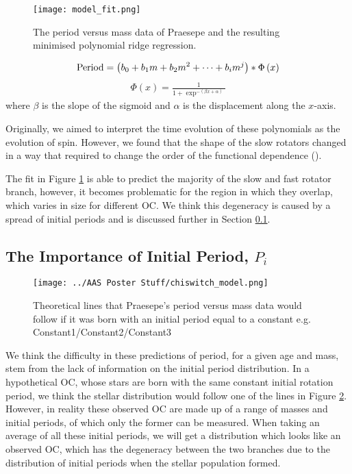 \documentclass[fleqn,usenatbib]{mnras}
\begin{document}
{\begin{figure}
	\texttt{[image: model\_fit.png]}
	\caption{The period versus mass data of Praesepe and the resulting minimised polynomial ridge regression.}
	\label{fig:model_fit}
\end{figure}
\begin{align}
	\label{eq:poly+sigmoid}
	\textup{Period} = \left(b_0 + b_1m + b_2m^2+\dots+b_im^j\right)*\Phi\left(x\right)
\end{align}
\begin{align}
	\label{eq:sigmoid}
	\Phi\left(x\right) = \frac{1}{1 + \exp^{-(\beta x + \alpha)}}
\end{align}
where $\beta$ is the slope of the sigmoid and $\alpha$ is the displacement along the $x$-axis.

Originally, we aimed to interpret the time evolution of these polynomials as the evolution of spin.
However, we found that the shape of the slow rotators changed in a way that required to change the order of the functional dependence (\cite{2019ApJ...879...49C}).

The fit in Figure \ref{fig:model_fit} is able to predict the majority of the slow and fast rotator branch, however, it becomes problematic for the region in which they overlap, which varies in size for different OC.
We think this degeneracy is caused by a spread of initial periods and is discussed further in Section \ref{sec:initial_period}.

\subsection{The Importance of Initial Period, $P_i$} \label{sec:initial_period}
\begin{figure}
	\texttt{[image: ../AAS Poster Stuff/chiswitch\_model.png]}
	\caption{Theoretical lines that Praesepe's period versus mass data would follow if it was born with an initial period equal to a constant e.g. Constant1/Constant2/Constant3}
	\label{fig:spread_initial_period}
\end{figure}
We think the difficulty in these predictions of period, for a given age and mass, stem from the lack of information on the initial period distribution.
In a hypothetical OC, whose stars are born with the same constant initial rotation period, we think the stellar distribution would follow one of the lines in Figure \ref{fig:spread_initial_period}.
However, in reality these observed OC are made up of a range of masses and initial periods, of which only the former can be measured.
When taking an average of all these initial periods, we will get a distribution which looks like an observed OC, which has the degeneracy between the two branches due to the distribution of initial periods when the stellar population formed.

}
\end{document}
